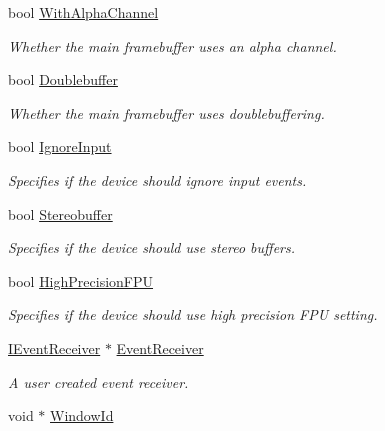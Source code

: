 \begin{DoxyCompactItemize}
bool \hyperlink{structirr_1_1SIrrlichtCreationParameters_acae5b5e41cec776aa4d05a03f16c57f2}{With\+Alpha\+Channel}
\begin{DoxyCompactList}\small\item\em Whether the main framebuffer uses an alpha channel. \end{DoxyCompactList}\item 
bool \hyperlink{structirr_1_1SIrrlichtCreationParameters_a49f2c3ed6cc7a28f2fde6683ac0b3267}{Doublebuffer}
\begin{DoxyCompactList}\small\item\em Whether the main framebuffer uses doublebuffering. \end{DoxyCompactList}\item 
bool \hyperlink{structirr_1_1SIrrlichtCreationParameters_acf9aee48aa9193f025f5f855d5a147cb}{Ignore\+Input}
\begin{DoxyCompactList}\small\item\em Specifies if the device should ignore input events. \end{DoxyCompactList}\item 
bool \hyperlink{structirr_1_1SIrrlichtCreationParameters_ae5dd722bd6c5a7001b73ef92264220a5}{Stereobuffer}
\begin{DoxyCompactList}\small\item\em Specifies if the device should use stereo buffers. \end{DoxyCompactList}\item 
bool \hyperlink{structirr_1_1SIrrlichtCreationParameters_ac790f1359a357f705bc2a5b24a6cc55d}{High\+Precision\+F\+PU}
\begin{DoxyCompactList}\small\item\em Specifies if the device should use high precision F\+PU setting. \end{DoxyCompactList}\item 
\mbox{\label{structirr_1_1SIrrlichtCreationParameters_a62c81497eedbae47ab745d1a6dfda09e}} 
\hyperlink{classirr_1_1IEventReceiver}{I\+Event\+Receiver} $\ast$ \hyperlink{structirr_1_1SIrrlichtCreationParameters_a62c81497eedbae47ab745d1a6dfda09e}{Event\+Receiver}
\begin{DoxyCompactList}\small\item\em A user created event receiver. \end{DoxyCompactList}\item 
void $\ast$ \hyperlink{structirr_1_1SIrrlichtCreationParameters_a0a26cda9a187b312dc4df26c4e9c52f1}{Window\+Id}

\end{DoxyCompactItemize}
